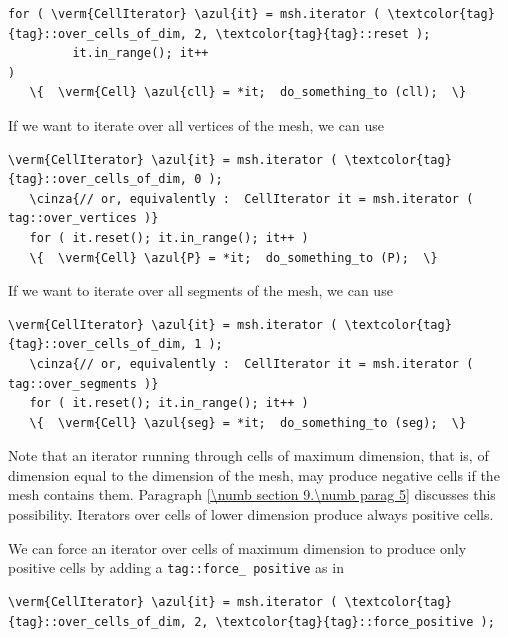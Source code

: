 \begin{Verbatim}[commandchars=\\\{\},formatcom=\small\tt,
   baselinestretch=0.94,framesep=2mm                      ]
   for ( \verm{CellIterator} \azul{it} = msh.iterator ( \textcolor{tag}{tag}::over_cells_of_dim, 2, \textcolor{tag}{tag}::reset );
         it.in_range(); it++                                                       )
   \{  \verm{Cell} \azul{cll} = *it;  do_something_to (cll);  \}
\end{Verbatim}

If we want to iterate over all vertices of the mesh, we can use

\begin{Verbatim}[commandchars=\\\{\},formatcom=\small\tt,
   baselinestretch=0.94,framesep=2mm                      ]
   \verm{CellIterator} \azul{it} = msh.iterator ( \textcolor{tag}{tag}::over_cells_of_dim, 0 );
   \cinza{// or, equivalently :  CellIterator it = msh.iterator ( tag::over_vertices )}
   for ( it.reset(); it.in_range(); it++ )
   \{  \verm{Cell} \azul{P} = *it;  do_something_to (P);  \}
\end{Verbatim}

If we want to iterate over all segments of the mesh, we can use

\begin{Verbatim}[commandchars=\\\{\},formatcom=\small\tt,
   baselinestretch=0.94,framesep=2mm                      ]
   \verm{CellIterator} \azul{it} = msh.iterator ( \textcolor{tag}{tag}::over_cells_of_dim, 1 );
   \cinza{// or, equivalently :  CellIterator it = msh.iterator ( tag::over_segments )}
   for ( it.reset(); it.in_range(); it++ )
   \{  \verm{Cell} \azul{seg} = *it;  do_something_to (seg);  \}
\end{Verbatim}

Note that an iterator running through cells of maximum dimension, that is, of dimension equal
to the dimension of the mesh, may produce negative cells if the mesh contains them.
Paragraph \ref{\numb section 9.\numb parag 5} discusses this possibility.
Iterators over cells of lower dimension produce always positive cells.

We can force an iterator over cells of maximum dimension to produce only positive cells
by adding a {\small\tt \textcolor{tag}{tag}::force\_\,positive} as in

\begin{Verbatim}[commandchars=\\\{\},formatcom=\small\tt,
   baselinestretch=0.94,framesep=2mm                      ]
   \verm{CellIterator} \azul{it} = msh.iterator ( \textcolor{tag}{tag}::over_cells_of_dim, 2, \textcolor{tag}{tag}::force_positive );
\end{Verbatim}

